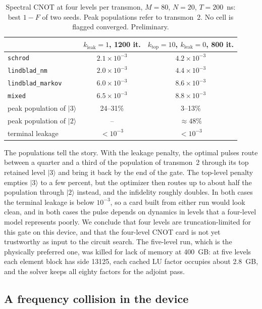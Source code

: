 \documentclass[10pt]{article}
\begin{document}
\begin{table}[htbp]
\centering
\caption{Spectral CNOT at four levels per transmon, $M = 80$, $N = 20$,
$T = 200$~ns: best $1 - F$ of two seeds. Peak populations refer to transmon~2.
No cell is flagged converged. Preliminary.}
\label{tab:cnot}
\small
\begin{tabular}{lcc}
\toprule
 & $k_{\mathrm{leak}} = 1$, 1200 it. & $k_{\mathrm{top}} = 10$, $k_{\mathrm{leak}} = 0$, 800 it. \\
\midrule
\texttt{schrod}          & $2.1\times10^{-3}$ & $4.2\times10^{-3}$ \\
\texttt{lindblad\_nm}    & $2.0\times10^{-3}$ & $4.4\times10^{-3}$ \\
\texttt{lindblad\_markov}& $6.0\times10^{-3}$ & $8.6\times10^{-3}$ \\
\texttt{mixed}           & $6.5\times10^{-3}$ & $8.8\times10^{-3}$ \\
\midrule
peak population of $|3\rangle$ & 24--31\% & 3--13\% \\
peak population of $|2\rangle$ & -- & $\approx 48\%$ \\
terminal leakage & $< 10^{-3}$ & $< 10^{-3}$ \\
\bottomrule
\end{tabular}
\end{table}

The populations tell the story. With the leakage penalty, the optimal pulses
route between a quarter and a third of the population of transmon~2 through
its top retained level $|3\rangle$ and bring it back by the end of the gate.
The top-level penalty empties $|3\rangle$ to a few percent, but the optimizer
then routes up to about half the population through $|2\rangle$ instead, and
the infidelity roughly doubles. In both cases the terminal leakage is below
$10^{-3}$, so a card built from either run would look clean, and in both cases
the pulse depends on dynamics in levels that a four-level model represents
poorly. We conclude that four levels are truncation-limited for this gate on
this device, and that the four-level CNOT card is not yet trustworthy as input
to the circuit search. The five-level run, which is the physically preferred
one, was killed for lack of memory at 400~GB: at five levels each element block
has side 13125, each cached LU factor occupies about 2.8~GB, and the solver
keeps all eighty factors for the adjoint pass.

\subsection{A frequency collision in the device}
\label{sec:collision}
\end{document}

